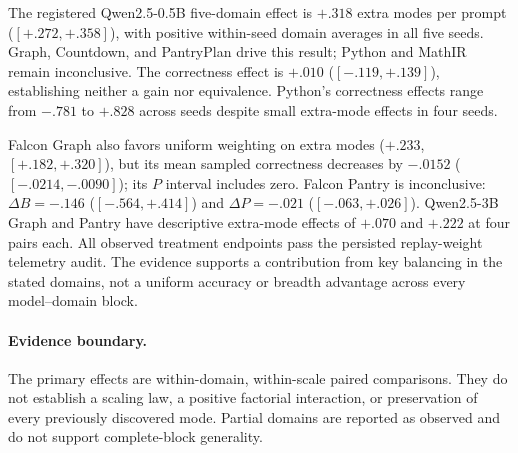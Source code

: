 \begin{table}[H]
  \centering
  \caption{\textbf{Uniform versus fresh-frequency replay at pass 8.}
  Effects are uniform minus frequency weighting. Brackets give the paired
  percentile bootstrap interval for $\Delta B$ over all $5^5$ ordered
  resamples in complete blocks. Every observed treatment endpoint in this
  snapshot passes the persisted replay-weight telemetry audit. Partial blocks retain exact seed counts.
  \href{https://huggingface.co/od2961/maxent-grpo-models/blob/main/experiments/E120-R1/README.md\#comparators}{Paired model exports}.}
  \label{tab:current-e120}
  \scriptsize
  \setlength{\tabcolsep}{3pt}
\end{table}


The registered Qwen2.5-0.5B five-domain effect is $+.318$ extra modes per
prompt ($[+.272,+.358]$), with positive within-seed domain averages in all
five seeds. Graph, Countdown, and PantryPlan drive this result; Python and
MathIR remain inconclusive. The correctness effect is $+.010$
($[-.119,+.139]$), establishing neither a gain nor equivalence. Python's
correctness effects range from $-.781$ to $+.828$ across seeds despite
small extra-mode effects in four seeds.

Falcon Graph also favors uniform weighting on extra modes ($+.233$,
$[+.182,+.320]$), but its mean sampled correctness decreases by $-.0152$
($[-.0214,-.0090]$); its $P$ interval includes zero. Falcon Pantry is
inconclusive: $\Delta B=-.146$ ($[-.564,+.414]$) and $\Delta P=-.021$
($[-.063,+.026]$). Qwen2.5-3B Graph and Pantry have descriptive extra-mode
effects of $+.070$ and $+.222$ at four pairs each. All observed treatment
endpoints pass the persisted replay-weight telemetry audit. The evidence
supports a contribution from key balancing in the stated domains, not a
uniform accuracy or breadth advantage across every model--domain block.

\paragraph{Evidence boundary.}
\label{app:scale-boundary}
The primary effects are within-domain, within-scale paired comparisons.
They do not establish a scaling law, a positive factorial interaction, or
preservation of every previously discovered mode. Partial domains are
reported as observed and do not support complete-block generality.

